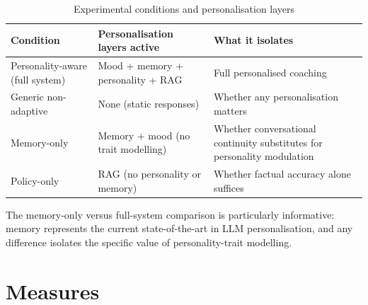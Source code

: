 \documentclass[10pt,a4paper]{report}
\begin{document}
\begin{table}[H]
\centering\small
\caption{Experimental conditions and personalisation layers}
\begin{tabularx}{\textwidth}{@{}lXX@{}}
\toprule
Condition & Personalisation layers active & What it isolates \\
\midrule
Personality-aware (full system) & Mood + memory + personality + RAG & Full personalised coaching \\
Generic non-adaptive & None (static responses) & Whether any personalisation matters \\
Memory-only & Memory + mood (no trait modelling) & Whether conversational continuity substitutes for personality modulation \\
Policy-only & RAG (no personality or memory) & Whether factual accuracy alone suffices \\
\bottomrule
\end{tabularx}
\end{table}

The memory-only versus full-system comparison is particularly informative: memory represents the current state-of-the-art in LLM personalisation, and any difference isolates the specific value of personality-trait modelling.

\section{Measures}
\end{document}
